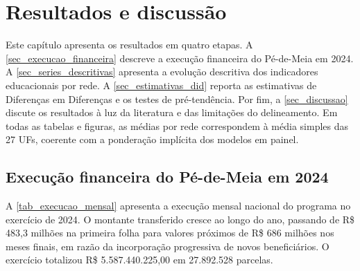 
\chapter{Resultados e discussão}
\label{chap_resultados}

Este capítulo apresenta os resultados em quatro etapas.
A \autoref{sec_execucao_financeira} descreve a execução financeira do Pé-de-Meia em 2024.
A \autoref{sec_series_descritivas} apresenta a evolução descritiva dos indicadores educacionais por rede.
A \autoref{sec_estimativas_did} reporta as estimativas de Diferenças em Diferenças e os testes de pré-tendência.
Por fim, a \autoref{sec_discussao} discute os resultados à luz da literatura e das limitações do delineamento.
Em todas as tabelas e figuras, as médias por rede correspondem à média simples das 27 UFs, coerente com a ponderação implícita dos modelos em painel.

\section{Execução financeira do Pé-de-Meia em 2024}
\label{sec_execucao_financeira}

A \autoref{tab_execucao_mensal} apresenta a execução mensal nacional do programa no exercício de 2024.
O montante transferido cresce ao longo do ano, passando de R\$ 483,3 milhões na primeira folha para valores próximos de R\$ 686 milhões nos meses finais, em razão da incorporação progressiva de novos beneficiários.
O exercício totalizou R\$ 5.587.440.225,00 em 27.892.528 parcelas.

